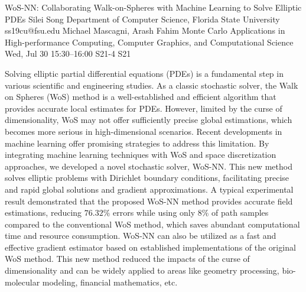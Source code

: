 \documentclass[12pt,lettersize,oneside]{book} %
\begin{document}
\begin{talk}
  {WoS-NN: Collaborating Walk-on-Spheres with Machine Learning to Solve Elliptic PDEs}%
  {Silei Song}%
  {Department of Computer Science, Florida State University}%
  {ss19cu@fsu.edu}%
  {Michael Mascagni, Arash Fahim}%
  {Monte Carlo Applications in High-performance Computing, Computer Graphics, and Computational Science}%
  {Wed, Jul 30 15:30--16:00}%
  {S21-4}%
  {S21}%
    
   
Solving elliptic partial differential equations (PDEs) is a fundamental step in various scientific and engineering studies. As a classic stochastic solver, the Walk on Spheres (WoS) method is a well-established and efficient algorithm that provides accurate local estimates for PDEs. However, limited by the curse of dimensionality, WoS may not offer sufficiently precise global estimations, which becomes more serious in high-dimensional scenarios. Recent developments in machine learning offer promising strategies to address this limitation. By integrating machine learning techniques with WoS and space discretization approaches, we developed a novel stochastic solver, WoS-NN. This new method solves elliptic problems with Dirichlet boundary conditions, facilitating precise and rapid global solutions and gradient approximations. A typical experimental result demonstrated that the proposed WoS-NN method provides accurate field estimations, reducing $76.32\%$ errors while using only $8\%$ of path samples compared to the conventional WoS method, which saves abundant computational time and resource consumption. WoS-NN can also be utilized as a fast and effective gradient estimator based on established implementations of the original WoS method. This new method reduced the impacts of the curse of dimensionality and can be widely applied to areas like geometry processing, bio-molecular modeling, financial mathematics, etc.

\medskip

\end{talk}
\end{document}
